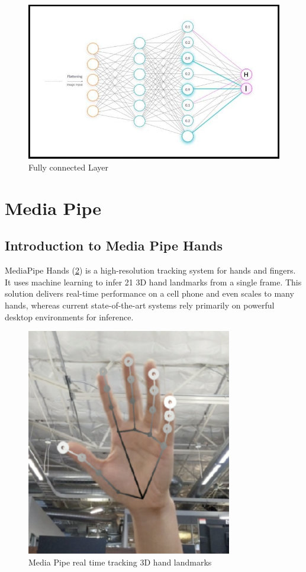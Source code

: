 \begin{figure}[H]
	\centering
	\includegraphics[width=\textwidth]{img/Chap3/FC}
	\caption{ Fully connected Layer}
	\label{fig:Chap3-FC}
\end{figure}
\section{ Media Pipe }
\subsection{Introduction to Media Pipe Hands}
MediaPipe Hands (\ref{fig:Chap3-MediaPipe}) is a high-resolution tracking system for hands and fingers. It uses machine learning to infer 21 3D hand landmarks from a single frame. This solution delivers real-time performance on a cell phone and even scales to many hands, whereas current state-of-the-art systems rely primarily on powerful desktop environments for inference.

\begin{figure}[H]
	\centering
	\includegraphics[width=0.8\textwidth]{img/Chap3/Media Pipe}
	\caption{ Media Pipe real time tracking 3D hand landmarks}
	\label{fig:Chap3-MediaPipe}
\end{figure}


